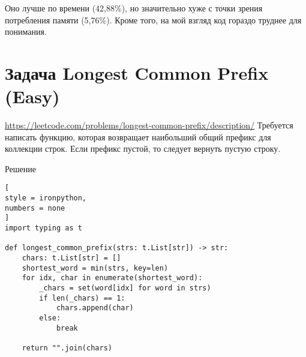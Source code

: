 \documentclass[%
	11pt,
	a4paper,
	utf8,
		]{article}
\begin{document}
Оно лучше по времени (42,88\%), но значительно хуже с точки зрения потребления памяти (5,76\%). Кроме того, на мой взгляд код гораздо труднее для понимания.

\section{Задача Longest Common Prefix (Easy)}

\noindent\url{https://leetcode.com/problems/longest-common-prefix/description/} Требуется написать функцию, которая возвращает наибольший общий префикс для коллекции строк. Если префикс пустой, то следует вернуть пустую строку.

Решение
\begin{lstlisting}[
style = ironpython,
numbers = none
]
import typing as t

def longest_common_prefix(strs: t.List[str]) -> str:
    chars: t.List[str] = []
    shortest_word = min(strs, key=len)
    for idx, char in enumerate(shortest_word):
        _chars = set(word[idx] for word in strs)
        if len(_chars) == 1:
            chars.append(char)
        else:
            break
    
    return "".join(chars)
\end{lstlisting}




\begin{thebibliography}{99}
	

	
	
	
\end{thebibliography}


\end{document}
